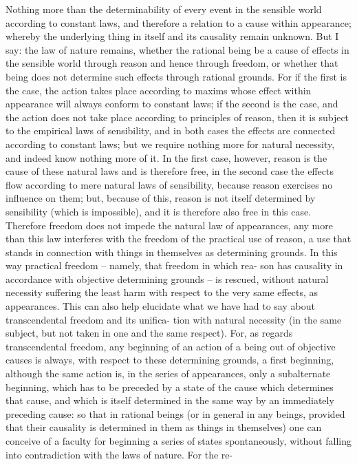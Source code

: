 Nothing more than the determinability of every event in the sensible
world according to constant laws, and therefore a relation to a cause
within appearance; whereby the underlying thing in itself and its causality
remain unknown. But I say: the law of nature remains, whether the rational
being be a cause of effects in the sensible world through reason and hence
through freedom, or whether that being does not determine such effects
through rational grounds. For if the ﬁrst is the case, the action takes place
according to maxims whose effect within appearance will always conform
to constant laws; if the second is the case, and the action does not take
place according to principles of reason, then it is subject to the empirical
laws of sensibility, and in both cases the effects are connected according
to constant laws; but we require nothing more for natural necessity, and
indeed know nothing more of it. In the ﬁrst case, however, reason is the
cause of these natural laws and is therefore free, in the second case the
effects ﬂow according to mere natural laws of sensibility, because reason
exercises no inﬂuence on them; but, because of this, reason is not itself
determined by sensibility (which is impossible), and it is therefore also
free in this case. Therefore freedom does not impede the natural law of
appearances, any more than this law interferes with the freedom of the
practical use of reason, a use that stands in connection with things in
themselves as determining grounds.
In this way practical freedom – namely, that freedom in which rea-
son has causality in accordance with objective determining grounds – is
rescued, without natural necessity suffering the least harm with respect
to the very same effects, as appearances. This can also help elucidate
what we have had to say about transcendental freedom and its uniﬁca-
tion with natural necessity (in the same subject, but not taken in one and
the same respect). For, as regards transcendental freedom, any beginning
of an action of a being out of objective causes is always, with respect to
these determining grounds, a ﬁrst beginning, although the same action
is, in the series of appearances, only a subalternate beginning, which has
to be preceded by a state of the cause which determines that cause, and
which is itself determined in the same way by an immediately preceding
cause: so that in rational beings (or in general in any beings, provided
that their causality is determined in them as things in themselves) one
can conceive of a faculty for beginning a series of states spontaneously,
without falling into contradiction with the laws of nature. For the re-
